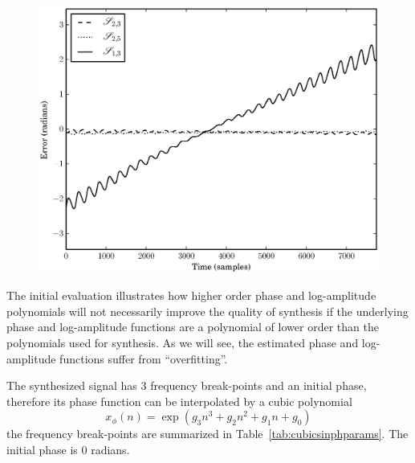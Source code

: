 \begin{figure}[!t]
    \centering
    \includegraphics[width=\figwidthscale\textwidth]{plots/mq_mod_err_comp_phase_err.eps}
\end{figure}

The initial evaluation illustrates how higher order phase and log-amplitude polynomials will not
necessarily improve the quality of synthesis if the underlying phase and
log-amplitude functions are
a polynomial of lower order than the polynomials used for synthesis. As we will
see, the estimated phase and log-amplitude functions suffer from ``overfitting''.

The synthesized signal has 3 frequency break-points and an initial phase,
therefore its phase function can be interpolated by a cubic polynomial
\[
    x_{\phi}(n) = \exp \left(g_3 n^{3} + g_2 n^{2} + g_1 n + g_0 \right)
\]
the frequency break-points are summarized in Table~\ref{tab:cubicsinphparams}. The
initial phase is $0$ radians.

